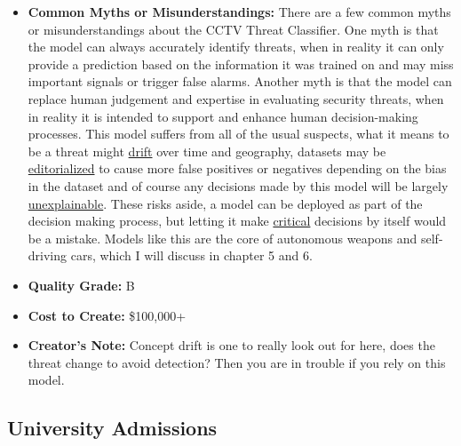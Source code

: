 \begin{itemize}
\begin{itemize}
    \item \textbf{Common Myths or Misunderstandings:} There are a few common myths or misunderstandings about the CCTV Threat Classifier. One myth is that the model can always accurately identify threats, when in reality it can only provide a prediction based on the information it was trained on and may miss important signals or trigger false alarms. Another myth is that the model can replace human judgement and expertise in evaluating security threats, when in reality it is intended to support and enhance human decision-making processes. This model suffers from all of the usual suspects, what it means to be a threat might \hyperref[sec:drift]{drift} over time and geography, datasets may be \hyperref[sec:janitor]{editorialized} to cause more false positives or negatives depending on the bias in the dataset and of course any decisions made by this model will be largely \hyperref[sec:explain]{unexplainable}. These risks aside, a model can be deployed as part of the decision making process, but letting it make \hyperref[sec:creative]{critical} decisions by itself would be a mistake. Models like this are the core of autonomous weapons and self-driving cars, which I will discuss in chapter 5 and 6.
    \item \textbf{Quality Grade:} B
    \item \textbf{Cost to Create:} \$100,000+
    \item \textbf{Creator's Note:} Concept drift is one to really look out for here, does the threat change to avoid detection? Then you are in trouble if you rely on this model.
\end{itemize}


\subsection{University Admissions}


\end{itemize}
